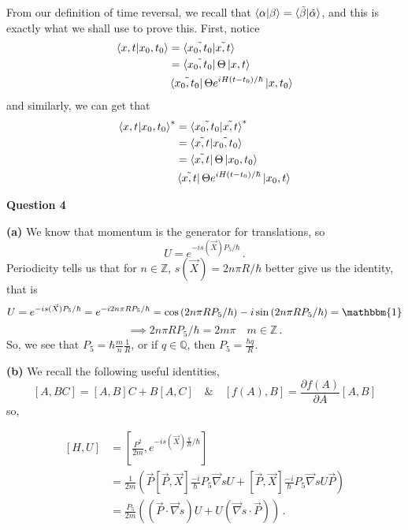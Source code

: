 \documentclass[10pt]{article}
\newcommand{\Z}{\mathbb{Z}}
\newcommand{\Q}{\mathbb{Q}}
\begin{document}
From our definition of time reversal, we recall that $\braket{\alpha|\beta} = \braket{\tilde{\beta}|\tilde{\alpha}}$, and this is exactly what we shall use to prove this. First, notice
\begin{equation*}
  \begin{split}
    \braket{x,t|x_{0},t_{0}} & = \braket{\tilde{x_{0},t_{0}}|\tilde{x,t}} \\
    & = \bra{\tilde{x_{0},t_{0}}}\Theta \ket{x,t} \\
    & \bra{\tilde{x_{0},t_{0}}}\Theta e^{iH(t - t_{0})/\hbar}\ket{x,t_{0}} \\
  \end{split}
\end{equation*}
and similarly, we can get that
\begin{equation*}
  \begin{split}
    \braket{x,t|x_{0},t_{0}}^{*} & = \braket{\tilde{x_{0},t_{0}}|\tilde{x,t}}^{*} \\
    & = \braket{\tilde{x,t}|\tilde{x_{0},t_{0}}} \\
    & = \bra{\tilde{x,t}}\Theta \ket{x_{0},t_{0}} \\
    & \bra{\tilde{x,t}}\Theta e^{iH(t - t_{0})/\hbar}\ket{x_{0},t} \\
  \end{split}
\end{equation*}

\textbf{Question 4}

\textbf{(a)} We know that momentum is the generator for translations, so
\[ U = e^{ -i s(\vec{X}) P_{5}/\hbar} \, .\]
Periodicity tells us that for $n \in \Z$, $s(\vec{X}) = 2n\pi R/\hbar$ better give us the identity, that is
\[ U = e^{ -i s(\vec{X}) P_{5}/\hbar} = e^{ -i 2n\pi RP_{5}/\hbar} = \cos\left(2n\pi RP_{5}/\hbar\right) - i\sin\left(2n\pi RP_{5}/\hbar\right) = \mathbbm{1} \]
\[ \implies 2n\pi RP_{5}/\hbar = 2m\pi \quad m \in \Z\, .\]
So, we see that $P_{5} = \hbar\frac{m}{n}\frac{1}{R}$, or if $q\in \Q$, then $P_{5} = \frac{\hbar q}{R}$.

\textbf{(b)} We recall the following useful identities,
\[ [A,BC] = [A,B]C + B[A,C] \quad \& \quad [f(A), B] = \frac{\partial f(A)}{\partial A}[A,B]\]
so,

\begin{equation*}
  \begin{split}
    [H,U] & = \left[\frac{P^{2}}{2m},e^{-is(\vec{X})\frac{q}{R}/\hbar}\right] \\
    & = \frac{1}{2m}\left(\vec{P}[\vec{P},\vec{X}]\frac{-i}{\hbar}P_{5}\vec{\nabla}s U + [\vec{P},\vec{X}]\frac{-i}{\hbar}P_{5}\vec{\nabla}s U\vec{P}\right) \\
    & = \boxed{\frac{P_{5}}{2m}\left((\vec{P}\cdot \vec{\nabla}s)U + U(\vec{\nabla}s \cdot \vec{P})\right)}\, . \\
   \end{split}
\end{equation*}
\end{document}
